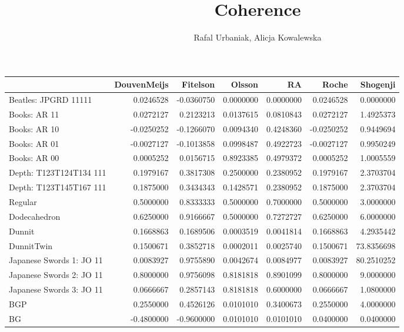 \documentclass[10pt,]{scrartcl}
\title{Coherence}
\author{Rafal Urbaniak, Alicja Kowalewska}
\date{}
\begin{document}
\maketitle

\begin{table}[H]
\centering
\begin{tabular}{lrrrrrr}
\toprule
  & DouvenMeijs & Fitelson & Olsson & RA & Roche & Shogenji\\
\midrule
\rowcolor{gray!6}  Beatles: JPGRD 11111 & 0.0246528 & -0.0360750 & 0.0000000 & 0.0000000 & 0.0246528 & 0.0000000\\
Books: AR 11 & 0.0272127 & 0.2123213 & 0.0137615 & 0.0810843 & 0.0272127 & 1.4925373\\
\rowcolor{gray!6}  Books: AR 10 & -0.0250252 & -0.1266070 & 0.0094340 & 0.4248360 & -0.0250252 & 0.9449694\\
Books: AR 01 & -0.0027127 & -0.1013858 & 0.0998487 & 0.4922723 & -0.0027127 & 0.9950249\\
\rowcolor{gray!6}  Books: AR 00 & 0.0005252 & 0.0156715 & 0.8923385 & 0.4979372 & 0.0005252 & 1.0005559\\
Depth: T123T124T134 111 & 0.1979167 & 0.3817308 & 0.2500000 & 0.2380952 & 0.1979167 & 2.3703704\\
\rowcolor{gray!6}  Depth: T123T145T167 111 & 0.1875000 & 0.3434343 & 0.1428571 & 0.2380952 & 0.1875000 & 2.3703704\\
Regular & 0.5000000 & 0.8333333 & 0.5000000 & 0.7000000 & 0.5000000 & 3.0000000\\
\rowcolor{gray!6}  Dodecahedron & 0.6250000 & 0.9166667 & 0.5000000 & 0.7272727 & 0.6250000 & 6.0000000\\
Dunnit & 0.1668863 & 0.1689506 & 0.0003519 & 0.0041814 & 0.1668863 & 4.2935442\\
\rowcolor{gray!6}  DunnitTwin & 0.1500671 & 0.3852718 & 0.0002011 & 0.0025740 & 0.1500671 & 73.8356698\\
Japanese Swords 1: JO 11 & 0.0083927 & 0.9755890 & 0.0042674 & 0.0084977 & 0.0083927 & 80.2510252\\
\rowcolor{gray!6}  Japanese Swords 2: JO 11 & 0.8000000 & 0.9756098 & 0.8181818 & 0.8901099 & 0.8000000 & 9.0000000\\
Japanese Swords 3: JO 11 & 0.0666667 & 0.2857143 & 0.8181818 & 0.6000000 & 0.0666667 & 1.0800000\\
\rowcolor{gray!6}  BGP & 0.2550000 & 0.4526126 & 0.0101010 & 0.3400673 & 0.2550000 & 4.0000000\\
BG & -0.4800000 & -0.9600000 & 0.0101010 & 0.0101010 & 0.0400000 & 0.0400000\\

\end{tabular}
\end{table}
\end{document}
